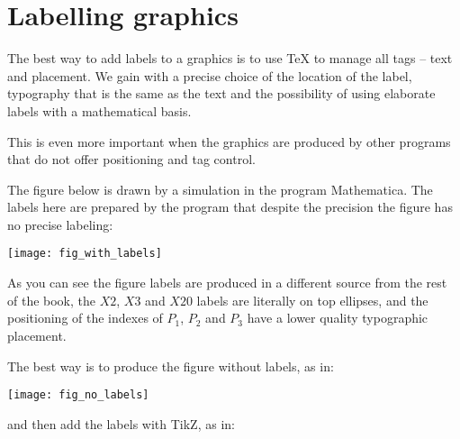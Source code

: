 \documentclass{book}
\begin{document}
\chapter{Labelling graphics}

The best way to add labels to a graphics is to use \TeX{}
to manage all tags -- text and placement. We gain with a 
precise choice of the location of the label, typography that
is the same as the text and the possibility of using elaborate
labels with a mathematical basis.

This is even more important when the graphics are produced by
other programs that do not offer positioning and tag control.

The figure below is drawn by a simulation in the program Mathematica.
The labels here are prepared by the program that despite the precision
the figure has no precise labeling:

\begin{center}
  \texttt{[image: fig\_with\_labels]}
\end{center}

As you can see the figure labels are produced in a different source
from the rest of the book, the $X2$, $X3$ and $X20$ labels are literally on top
ellipses, and the positioning of the indexes of $P_1$, $P_2$ and
$P_3$ have a lower quality typographic placement.

The best way is to produce the figure without labels, as in:

\begin{center}
  \texttt{[image: fig\_no\_labels]}
\end{center}

and then add the labels with TikZ, as in:

\begin{center}
\end{center}
\end{document}
